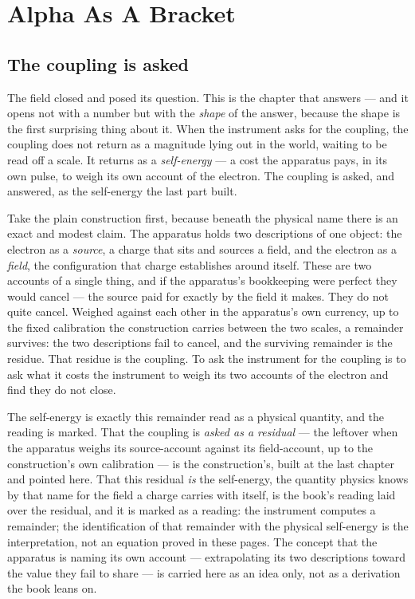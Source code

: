 \chapter{Alpha As A Bracket}

\section{The coupling is asked}

The field closed and posed its question. This is the chapter that answers --- and it opens not with a number but with the
\emph{shape} of the answer, because the shape is the first surprising thing about it. When the instrument asks for the
coupling, the coupling does not return as a magnitude lying out in the world, waiting to be read off a scale. It returns as a
\emph{self-energy} --- a cost the apparatus pays, in its own pulse, to weigh its own account of the electron. The coupling is
asked, and answered, as the self-energy the last part built.

Take the plain construction first, because beneath the physical name there is an exact and modest claim. The apparatus holds
two descriptions of one object: the electron as a \emph{source}, a charge that sits and sources a field, and the electron as
a \emph{field}, the configuration that charge establishes around itself. These are two accounts of a single thing, and if the
apparatus's bookkeeping were perfect they would cancel --- the source paid for exactly by the field it makes. They do not
quite cancel. Weighed against each other in the apparatus's own currency, up to the fixed calibration the construction
carries between the two scales, a remainder survives: the two descriptions fail to cancel, and the surviving remainder is the
residue. That residue is the coupling. To ask the instrument for the coupling is to ask what it costs the instrument to weigh
its two accounts of the electron and find they do not close.

The self-energy is exactly this remainder read as a physical quantity, and the reading is marked. That the coupling is
\emph{asked as a residual} --- the leftover when the apparatus weighs its source-account against its field-account, up to the
construction's own calibration --- is the construction's, built at the last chapter and pointed here. That this residual
\emph{is} the self-energy, the quantity physics knows by that name for the field a charge carries with itself, is the book's
reading laid over the residual, and it is marked as a reading: the instrument computes a remainder; the identification of that
remainder with the physical self-energy is the interpretation, not an equation proved in these pages. The concept that the
apparatus is naming its own account --- extrapolating its two descriptions toward the value they fail to share --- is carried
here as an idea only, not as a derivation the book leans on.

